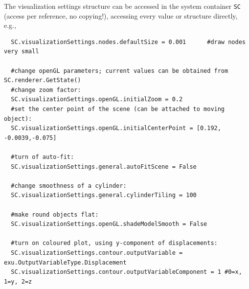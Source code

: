 
\noindent
The visualization settings structure can be accessed in the system container \texttt{SC} (access per reference, no copying!), accessing every value or structure directly, e.g.,
\pythonstyle\begin{lstlisting}
  SC.visualizationSettings.nodes.defaultSize = 0.001      #draw nodes very small

  #change openGL parameters; current values can be obtained from SC.renderer.GetState()
  #change zoom factor:
  SC.visualizationSettings.openGL.initialZoom = 0.2       
  #set the center point of the scene (can be attached to moving object):
  SC.visualizationSettings.openGL.initialCenterPoint = [0.192, -0.0039,-0.075]

  #turn of auto-fit:
  SC.visualizationSettings.general.autoFitScene = False

  #change smoothness of a cylinder:
  SC.visualizationSettings.general.cylinderTiling = 100
  
  #make round objects flat:
  SC.visualizationSettings.openGL.shadeModelSmooth = False

  #turn on coloured plot, using y-component of displacements:
  SC.visualizationSettings.contour.outputVariable = exu.OutputVariableType.Displacement
  SC.visualizationSettings.contour.outputVariableComponent = 1 #0=x, 1=y, 2=z
\end{lstlisting}

